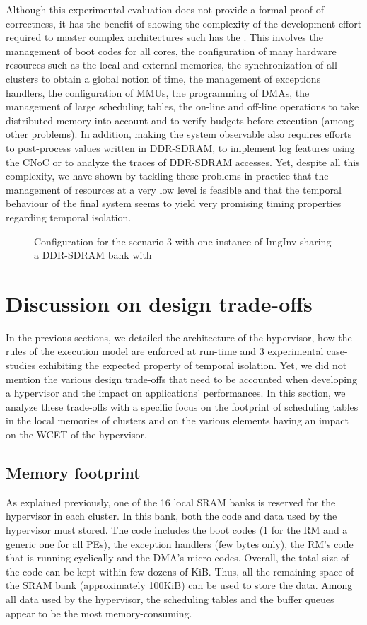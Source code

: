 \documentclass[main.tex]{subfiles}
\begin{document}
Although this experimental evaluation does not provide a formal proof of
correctness, it has the benefit of showing the complexity of the development
effort required to master complex architectures such has the \mppalong. This
involves the management of boot codes for all cores, the configuration of many
hardware resources such as the local and external memories, the synchronization
of all clusters to obtain a global notion of time, the management of exceptions
handlers, the configuration of MMUs, the programming of DMAs, the management of
large scheduling tables, the on-line and off-line operations to take
distributed memory into account and to verify budgets before execution (among
other problems). In addition, making the system observable also requires
efforts to post-process values written in DDR-SDRAM, to implement log features
using the CNoC or to analyze the traces of DDR-SDRAM accesses. Yet, despite all
this complexity, we have shown by tackling these problems in practice that the
management of resources at a very low level is feasible and that the temporal
behaviour of the final system seems to yield very promising timing properties
regarding temporal isolation.

\begin{figure}
    \centering
    \scalebox{0.7}{}
    \caption{Configuration for the scenario 3 with one instance of ImgInv sharing a DDR-SDRAM bank with \rosace}
    \label{fig_implemExecModel_scenario3budget}
\end{figure}

\section{Discussion on design trade-offs}
In the previous sections, we detailed the architecture of the hypervisor, how
the rules of the execution model are enforced at run-time and 3 experimental
case-studies exhibiting the expected property of temporal isolation. Yet, we
did not mention the various design trade-offs that need to be accounted when
developing a hypervisor and the impact on applications' performances. In this
section, we analyze these trade-offs with a specific focus on the footprint of
scheduling tables in the local memories of clusters and on the various elements
having an impact on the WCET of the hypervisor.

\subsection{Memory footprint}
As explained previously, one of the 16 local SRAM banks is reserved for the
hypervisor in each cluster. In this bank, both the code and data used by the
hypervisor must stored. The code includes the boot codes (1 for the RM and a
generic one for all PEs), the exception handlers (few bytes only), the RM's
code that is running cyclically and the DMA's micro-codes. Overall, the total
size of the code can be kept within few dozens of KiB. Thus, all the remaining
space of the SRAM bank (approximately 100KiB) can be used to store the data.
Among all data used by the hypervisor, the scheduling tables and the buffer
queues appear to be the most memory-consuming.
\end{document}
